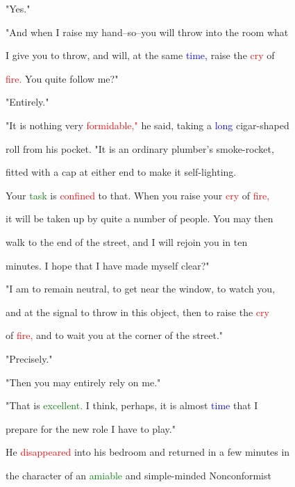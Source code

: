  "Yes."



 "And when I raise my hand--so--you will throw into the room what

 I give you to throw, and will, at the same \textcolor{blue}{time,} raise the \textcolor{red}{cry} of

 \textcolor{red}{fire.} You quite follow me?"



 "Entirely."



 "It is nothing very \textcolor{red}{formidable,"} he said, taking a \textcolor{blue}{long} cigar-shaped

 roll from his pocket. "It is an ordinary plumber's smoke-rocket,

 fitted with a \textcolor{BurntOrange}{cap} at either end to make it self-lighting.

 Your \textcolor{green}{task} is \textcolor{red}{confined} to that. When you raise your \textcolor{red}{cry} of \textcolor{red}{fire,}

 it will be taken up by quite a number of people. You may then

 walk to the end of the street, and I will rejoin you in ten

 minutes. I \textcolor{BurntOrange}{hope} that I have made myself clear?"



 "I am to remain \textcolor{BurntOrange}{neutral,} to get near the window, to \textcolor{BurntOrange}{watch} you,

 and at the signal to throw in this object, then to raise the \textcolor{red}{cry}

 of \textcolor{red}{fire,} and to \textcolor{BurntOrange}{wait} you at the corner of the street."



 "Precisely."



 "Then you may entirely rely on me."



 "That is \textcolor{green}{excellent.} I think, perhaps, it is almost \textcolor{blue}{time} that I

 \textcolor{BurntOrange}{prepare} for the new role I have to play."



 He \textcolor{red}{disappeared} into his bedroom and returned in a few minutes in

 the character of an \textcolor{green}{amiable} and simple-minded Nonconformist

